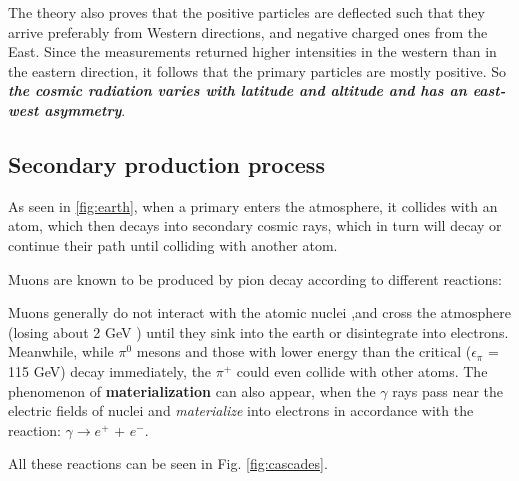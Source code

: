 The theory also proves that the positive particles are deflected such that they arrive preferably from Western directions, and negative charged ones from the East. Since the measurements returned higher intensities in the western than in the eastern direction, it follows that the primary particles are mostly positive. So \textit{\textbf{the cosmic radiation varies with latitude and altitude and has an east-west asymmetry}}.


	\subsection{Secondary production process}

	As seen in \ref{fig:earth}, when a primary enters the atmosphere, it collides with an atom, which then decays into secondary cosmic rays, which in turn will decay or continue their path until colliding with another atom.

	Muons are known to be produced by pion decay according to different reactions:

\bc

\ec

	Muons generally do not interact with the atomic nuclei ,and cross the atmosphere (losing about 2 GeV  \cite{eid:04}) until they sink into the earth or disintegrate into electrons. Meanwhile, while $\pi^0$ mesons and those with lower energy than the critical ($\epsilon_\pi$ = 115 GeV) decay immediately, the $\pi^+$ could even collide with other atoms. The phenomenon of \textbf{materialization} can also appear, when the $\gamma$ rays pass near the electric fields of nuclei and \textit{materialize} into electrons in accordance with the reaction: $\gamma \rightarrow e^+$ + $e^-$.

	All these reactions can be seen in Fig. \ref{fig:cascades}.

